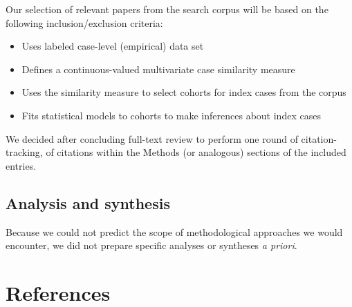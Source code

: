 \documentclass[preprint, 3p,
authoryear]{elsarticle} %
\providecommand{\tightlist}{%
  \setlength{\itemsep}{0pt}\setlength{\parskip}{0pt}}
\begin{document}
\label{sec:appendix-selection}

Our selection of relevant papers from the search corpus will be based on
the following inclusion/exclusion criteria:

\begin{itemize}
\tightlist
\item
  Uses labeled case-level (empirical) data set
\item
  Defines a continuous-valued multivariate case similarity measure
\item
  Uses the similarity measure to select cohorts for index cases from the
  corpus
\item
  Fits statistical models to cohorts to make inferences about index
  cases
\end{itemize}

We decided after concluding full-text review to perform one round of
citation-tracking, of citations within the Methods (or analogous)
sections of the included entries.

\hypertarget{analysis-and-synthesis}{%
\subsection{Analysis and synthesis}\label{analysis-and-synthesis}}

Because we could not predict the scope of methodological approaches we
would encounter, we did not prepare specific analyses or syntheses
\emph{a priori}.

\hypertarget{references}{%
\section*{References}\label{references}}
\end{document}
